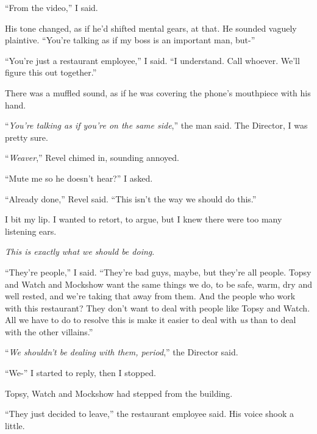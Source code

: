 ``From the video,'' I said.



His tone changed, as if he'd shifted mental gears, at that.  He sounded vaguely plaintive.  ``You're talking as if my boss is an important man, but-''



``You're just a restaurant employee,'' I said.  ``I understand.  Call whoever.  We'll figure this out together.''



There was a muffled sound, as if he was covering the phone's mouthpiece with his hand.



``\emph{You're talking as if you're on the same side},'' the man said.  The Director, I was pretty sure.



``\emph{Weaver},'' Revel chimed in, sounding annoyed.



``Mute me so he doesn't hear?'' I asked.



``Already done,'' Revel said.  ``This isn't the way we should do this.''



I bit my lip.  I wanted to retort, to argue, but I knew there were too many listening ears.



\emph{This is exactly what we should be doing}.



``They're people,'' I said.  ``They're bad guys, maybe, but they're all people.  Topsy and Watch and Mockshow want the same things we do, to be safe, warm, dry and well rested, and we're taking that away from them.  And the people who work with this restaurant?  They don't want to deal with people like Topsy and Watch.  All we have to do to resolve this is make it easier to deal with \emph{us} than to deal with the other villains.''



``\emph{We shouldn't be dealing with them, period},'' the Director said.



``We-'' I started to reply, then I stopped.



Topsy, Watch and Mockshow had stepped from the building.



``They just decided to leave,'' the restaurant employee said.  His voice shook a little.



